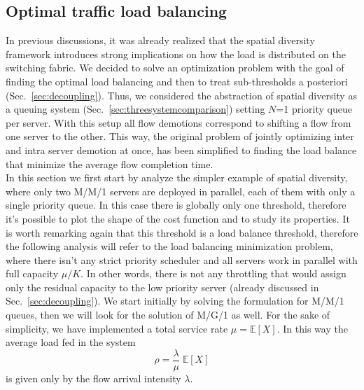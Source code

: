 \subsection{Optimal traffic load balancing}
In previous discussions, it was already realized that the spatial diversity framework introduces strong implications on how the load is distributed on the switching fabric. We decided to solve an optimization problem with the goal of finding the optimal load balancing and then to treat sub-thresholds a posteriori (Sec.~\ref{sec:decoupling}). Thus, we considered the abstraction of spatial diversity as a queuing system (Sec.~\ref{sec:threesystemcomparison}) setting $N$=1 priority queue per server. With this setup all flow demotions correspond to shifting a flow from one server to the other. This way, the original problem of jointly optimizing inter and intra server demotion at once, has been simplified to finding the load balance that minimize the average flow completion time. \\
In this section we first start by analyze the simpler example of spatial diversity, where only two M/M/1 servers are deployed in parallel, each of them with only a single priority queue. In this case there is globally only one threshold, therefore it's possible to plot the shape of the cost function and to study its properties. It is worth remarking again that this threshold is a load balance threshold, therefore the following analysis will refer to the load balancing minimization problem, where there isn't any strict priority scheduler and all servers work in parallel with full capacity $\mu/K$. In other words, there is not any throttling that would assign only the residual capacity to the low priority server (already discussed in Sec.~\ref{sec:decoupling}).  We start initially by solving the formulation for M/M/1 queues, then we will look for the solution of M/G/1 as well. For the sake of simplicity, we have implemented a total service rate $\mu = \mathbb{E}[X]$. In this way the average load fed in the system 
\[
\rho = \frac{\lambda}{\mu}\;\mathbb{E}[X]
\]
is given only by the flow arrival intensity $\lambda$.

